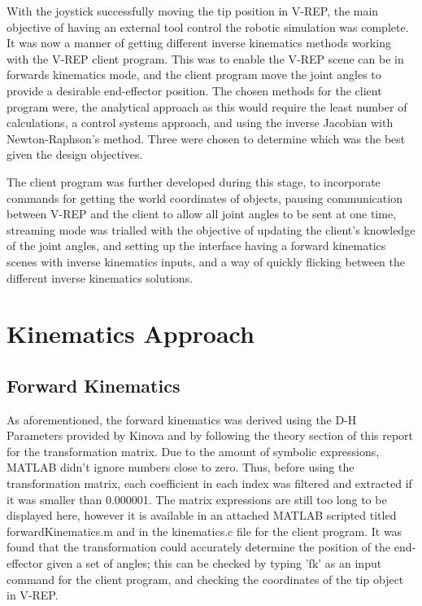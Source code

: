 \documentclass[12pt,openany,a4paper]{book}
\begin{document}
With the joystick successfully moving the tip position in V-REP, the main objective of having an external tool control the robotic simulation was complete. It was now a manner of getting different inverse kinematics methods working with the V-REP client program. This was to enable the V-REP scene can be in forwards kinematics mode, and the client program move the joint angles to provide a desirable end-effector position. The chosen methods for the client program were, the analytical approach as this would require the least number of calculations, a control systems approach, and using the inverse Jacobian with Newton-Raphson's method. Three were chosen to determine which was the best given the design objectives.

The client program was further developed during this stage, to incorporate commands for getting the world coordinates of objects, pausing communication between V-REP and the client to allow all joint angles to be sent at one time, streaming mode was trialled with the objective of updating the client's knowledge of the joint angles, and setting up the interface having a forward kinematics scenes with inverse kinematics inputs, and a way of quickly flicking between the different inverse kinematics solutions.

\chapter{Kinematics Approach}
\section{Forward Kinematics}
As aforementioned, the forward kinematics was derived using the D-H Parameters provided by Kinova and by following the theory section of this report for the transformation matrix. Due to the amount of symbolic expressions, MATLAB didn't ignore numbers close to zero. Thus, before using the transformation matrix, each coefficient in each index was filtered and extracted if it was smaller than 0.000001. The matrix expressions are still too long to be displayed here, however it is available in an attached MATLAB scripted titled forwardKinematics.m and in the kinematics.c file for the client program. It was found that the transformation could accurately determine the position of the end-effector given a set of angles; this can be checked by typing 'fk' as an input command for the client program, and checking the coordinates of the tip object in V-REP.
\end{document}
